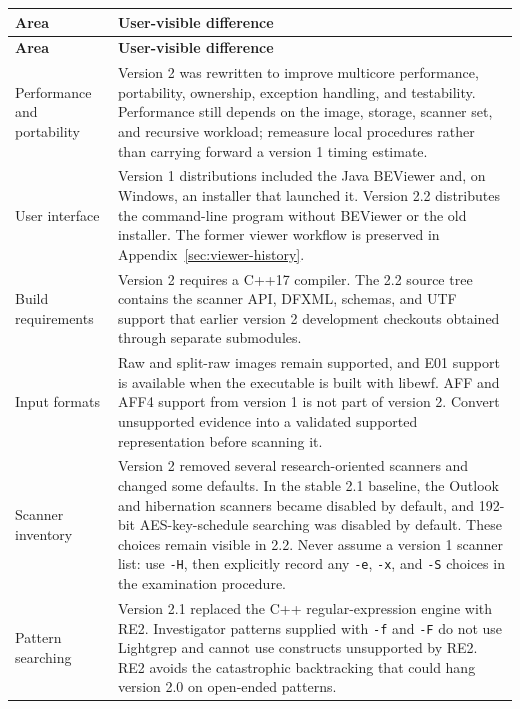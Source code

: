 \documentclass[11pt]{article}
\newcommand{\code}[1]{\texttt{#1}}
\begin{document}
\begin{longtable}{p{.25\linewidth}p{.69\linewidth}}
\toprule
\textbf{Area} & \textbf{User-visible difference} \\
\midrule
\endfirsthead
\toprule
\textbf{Area} & \textbf{User-visible difference} \\
\midrule
\endhead
Performance and portability & Version 2 was rewritten to improve multicore
performance, portability, ownership, exception handling, and testability.
Performance still depends on the image, storage, scanner set, and recursive
workload; remeasure local procedures rather than carrying forward a version 1
timing estimate. \\

User interface & Version 1 distributions included the Java BEViewer and, on
Windows, an installer that launched it. Version 2.2 distributes the
command-line program without BEViewer or the old installer. The former viewer
workflow is preserved in Appendix~\ref{sec:viewer-history}. \\

Build requirements & Version 2 requires a C++17 compiler. The 2.2 source tree
contains the scanner API, DFXML, schemas, and UTF support that earlier version
2 development checkouts obtained through separate submodules. \\

Input formats & Raw and split-raw images remain supported, and E01 support is
available when the executable is built with libewf. AFF and AFF4 support from
version 1 is not part of version 2. Convert unsupported evidence into a
validated supported representation before scanning it. \\

Scanner inventory & Version 2 removed several research-oriented scanners and
changed some defaults. In the stable 2.1 baseline, the Outlook and hibernation
scanners became disabled by default, and 192-bit AES-key-schedule searching
was disabled by default. These choices remain visible in 2.2. Never assume a
version 1 scanner list: use \code{-H}, then explicitly record any \code{-e},
\code{-x}, and \code{-S} choices in the examination procedure. \\

Pattern searching & Version 2.1 replaced the C++ regular-expression engine
with RE2. Investigator patterns supplied with \code{-f} and \code{-F} do not
use Lightgrep and cannot use constructs unsupported by RE2. RE2 avoids the
catastrophic backtracking that could hang version 2.0 on open-ended patterns. \\


\end{longtable}
\end{document}
